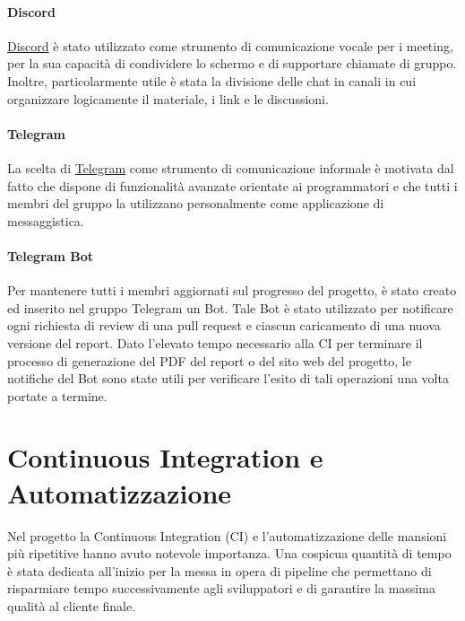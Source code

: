     \paragraph{Discord}
    \href{https://discord.com}{Discord} è stato utilizzato come strumento di comunicazione vocale per i meeting, per la sua capacità di condividere lo schermo e di supportare chiamate di gruppo. Inoltre, particolarmente utile è stata la divisione delle chat in canali in cui organizzare logicamente il materiale, i link e le discussioni.
    
    \paragraph{Telegram}
    La scelta di \href{https://telegram.org}{Telegram} come strumento di comunicazione informale è motivata dal fatto che dispone di funzionalità avanzate orientate ai programmatori e che tutti i membri del gruppo la utilizzano personalmente come applicazione di messaggistica.
    
    \paragraph{Telegram Bot} 
    Per mantenere tutti i membri aggiornati sul progresso del progetto, è stato creato ed inserito nel gruppo Telegram un Bot. Tale Bot è stato utilizzato per notificare ogni richiesta di review di una pull request e ciascun caricamento di una nuova versione del report.
    Dato l'elevato tempo necessario alla CI per terminare il processo di generazione del PDF del report o del sito web del progetto, le notifiche del Bot sono state utili per verificare l'esito di tali operazioni una volta portate a termine.

\section{Continuous Integration e Automatizzazione}\label{chap:CI}
Nel progetto la Continuous Integration (CI) e l'automatizzazione delle mansioni più ripetitive hanno avuto notevole importanza. Una cospicua quantità di tempo è stata dedicata all'inizio per la messa in opera di pipeline che permettano di risparmiare tempo successivamente agli sviluppatori e di garantire la massima qualità al cliente finale.

